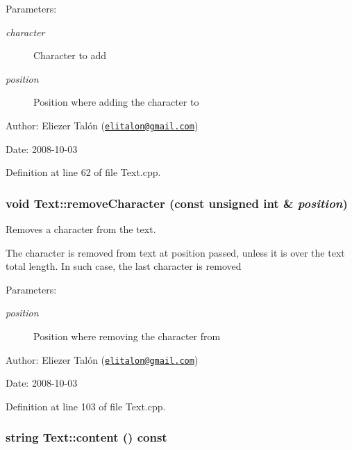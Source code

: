 \begin{Desc}
\item[Parameters:]
\begin{description}
\item[{\em character}]Character to add \item[{\em position}]Position where adding the character to\end{description}
\end{Desc}
\begin{Desc}
\item[Author:]Eliezer Talón (\href{mailto:elitalon@gmail.com}{\tt elitalon@gmail.com}) \end{Desc}
\begin{Desc}
\item[Date:]2008-10-03 \end{Desc}


Definition at line 62 of file Text.cpp.\hypertarget{class_text_e04500eeada2a4a3bb00554b32263c52}{
\subsubsection[removeCharacter]{\setlength{\rightskip}{0pt plus 5cm}void Text::removeCharacter (const unsigned int \& {\em position})}}
\label{class_text_e04500eeada2a4a3bb00554b32263c52}


Removes a character from the text. 

The character is removed from text at position passed, unless it is over the text total length. In such case, the last character is removed

\begin{Desc}
\item[Parameters:]
\begin{description}
\item[{\em position}]Position where removing the character from\end{description}
\end{Desc}
\begin{Desc}
\item[Author:]Eliezer Talón (\href{mailto:elitalon@gmail.com}{\tt elitalon@gmail.com}) \end{Desc}
\begin{Desc}
\item[Date:]2008-10-03 \end{Desc}


Definition at line 103 of file Text.cpp.\hypertarget{class_text_8a29bbf6c707ac8b2055a22723a82f3d}{
\subsubsection[content]{\setlength{\rightskip}{0pt plus 5cm}string Text::content () const}}
\label{class_text_8a29bbf6c707ac8b2055a22723a82f3d}


